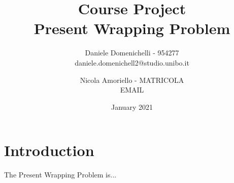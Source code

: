 \documentclass{report}
\title{Course Project\\Present Wrapping Problem}
\author{
    Daniele Domenichelli - 954277\\
    daniele.domenichell2@studio.unibo.it\\
    \and
    Nicola Amoriello - MATRICOLA\\
    EMAIL
}
\date{January 2021}
\begin{document}
    \maketitle

    \tableofcontents

    \chapter{Introduction}
    The Present Wrapping Problem is... %

    
    
    
    
    
\end{document}
